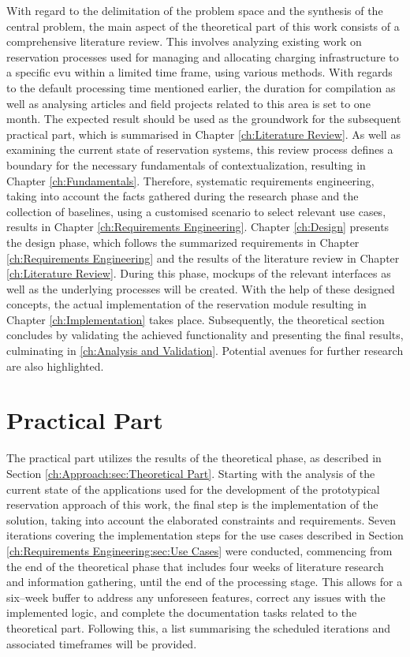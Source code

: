 With regard to the delimitation of the problem space and the synthesis of the central problem, the main aspect of the theoretical part of this work consists of a comprehensive literature review.
This involves analyzing existing work on reservation processes used for managing  and allocating charging infrastructure to a specific \acrshort{evu} within a limited time frame, using various methods.
With regards to the default processing time mentioned earlier, the duration for compilation as well as analysing articles and field projects related to this area is set to one month. 
The expected result should be used as the groundwork for the subsequent practical part, which is summarised in Chapter \ref{ch:Literature Review}.
As well as examining the current state of reservation systems, this review process defines a boundary for the necessary fundamentals of contextualization, resulting in Chapter \ref{ch:Fundamentals}.
Therefore, systematic requirements engineering, taking into account the facts gathered during the research phase and the collection of baselines, using a customised scenario to select relevant use cases, results in Chapter \ref{ch:Requirements Engineering}.
Chapter \ref{ch:Design} presents the design phase, which follows the summarized requirements in Chapter \ref{ch:Requirements Engineering} and the results of the literature review in Chapter \ref{ch:Literature Review}. During this phase, mockups of the relevant interfaces as well as the underlying processes will be created.
With the help of these designed concepts, the actual implementation of the reservation module resulting in Chapter \ref{ch:Implementation} takes place.
Subsequently, the theoretical section concludes by validating the achieved functionality and presenting the final results, culminating in \ref{ch:Analysis and Validation}. Potential avenues for further research are also highlighted.

\section{Practical Part}
\label{ch:Approach:sec:Practical Part}

The practical part utilizes the results of the theoretical phase, as described in Section \ref{ch:Approach:sec:Theoretical Part}. Starting with the analysis of the current state of the applications used for the development of the prototypical reservation approach of this work, the final step is the implementation of the solution, taking into account the elaborated constraints and requirements.
Seven iterations covering the implementation steps for the use cases described in Section \ref{ch:Requirements Engineering:sec:Use Cases} were conducted, commencing from the end of the theoretical phase that includes four weeks of literature research and information gathering, until the end of the processing stage.
This allows for a six--week buffer to address any unforeseen features, correct any issues with the implemented logic, and complete the documentation tasks related to the theoretical part.
Following this, a list summarising the scheduled iterations and associated timeframes will be provided.

